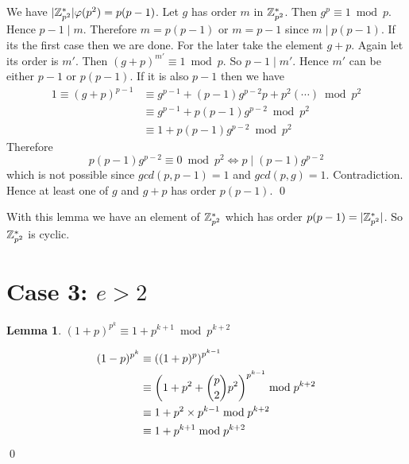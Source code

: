 \documentclass[a4paper, 11pt]{article}
\newtheorem{lemma}{Lemma}
\renewenvironment{proof}{\noindent{\it \textbf{Proof:}}\hspace*{1em}}{\qed\bigskip\\}
\begin{document}
{	\begin{proof}
		We have $|\mathbb{Z}_{p^2}^*|\varphi(p^2)=p(p-1)$. Let $g$ has order $m$ in $\mathbb{Z}_{p^2}^*$. Then $g^p\equiv 1\bmod p$. Hence $p-1\mid m$. Therefore $m=p(p-1)$ or $m=p-1$ since $m\mid p(p-1)$. If its the first case then we are done. For the later take the element $g+p$. Again let its order is $m'$. Then $(g+p)^{m'}\equiv 1\bmod p$. So $p-1\mid m'$. Hence $m'$ can be either $p-1$ or $p(p-1)$. If it is also $p-1$ then we have \begin{align*}
			1\equiv (g+p)^{p-1} & \equiv g^{p-1}+(p-1)g^{p-2}p+p^2(\cdots)\bmod {p^2}\\
			& \equiv g^{p-1}+p(p-1)g^{p-2}\bmod {p^2}\\
			& \equiv 1+p(p-1)g^{p-2}\bmod {p^2}
		\end{align*}
		Therefore $$p(p-1)g^{p-2}\equiv 0\bmod{p^2}\iff p\mid (p-1)g^{p-2}$$ which is not possible since $gcd(p,p-1)=1$ and $gcd(p,g)=1$. Contradiction. Hence at least one of $g$ and $g+p$ has order $p(p-1)$.  
	\end{proof}
	
	With this lemma we have an element of $\mathbb{Z}_{p^2}^*$ which has order $p(p-1)=|\mathbb{Z}_{p^2}^*|$. So $\mathbb{Z}_{p^2}^*$ is cyclic.
	
	
	
	
	\section*{Case 3: $e> 2$}
	\begin{lemma}
		$(1+p)^{p^k}\equiv 1+p^{k+1}\bmod {p^{k+2}}$
	\end{lemma}
	\begin{proof}
		\begin{align*}
			(1-p)^{p^k}& \equiv \left((1+p)^p   \right)^{p^{k-1}}\\
			& \equiv \left( 1+p^2+\binom{p}{2}p^2 \right)^{p^{k-1}}\bmod {p^{k+2}}\\
			& \equiv 1+p^2\times p^{k-1}\bmod p^{k+2}\\
			&\equiv 1+p^{k+1}\bmod{p^{k+2}}
		\end{align*}
	\end{proof}
	
	
}
\end{document}
